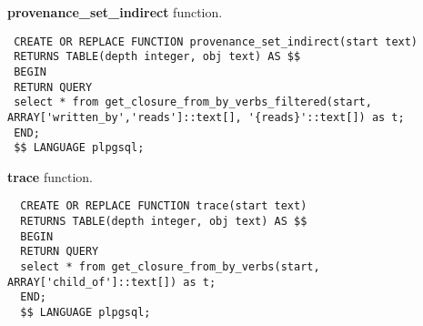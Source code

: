 \textbf{provenance\_set\_indirect} function.

\begin{verbatim}
 CREATE OR REPLACE FUNCTION provenance_set_indirect(start text)
 RETURNS TABLE(depth integer, obj text) AS $$
 BEGIN
 RETURN QUERY
 select * from get_closure_from_by_verbs_filtered(start, ARRAY['written_by','reads']::text[], '{reads}'::text[]) as t;
 END;
 $$ LANGUAGE plpgsql;
\end{verbatim}

\textbf{trace} function.

\begin{verbatim}
  CREATE OR REPLACE FUNCTION trace(start text)
  RETURNS TABLE(depth integer, obj text) AS $$
  BEGIN
  RETURN QUERY
  select * from get_closure_from_by_verbs(start, ARRAY['child_of']::text[]) as t;
  END;
  $$ LANGUAGE plpgsql;
\end{verbatim}
